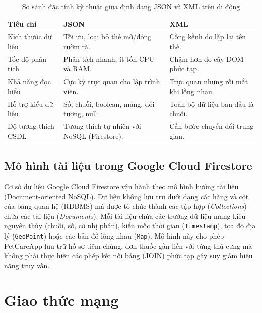 \begin{table}[H]
    \caption{So sánh đặc tính kỹ thuật giữa định dạng JSON và XML trên di động}
    \label{tab:so_sanh_json_xml}
    \centering
    \renewcommand{\arraystretch}{1.2}
    \begin{tabularx}{\textwidth}{|l|X|X|}
        \hline
        \textbf{Tiêu chí} & \textbf{JSON} & \textbf{XML} \\ \hline
        Kích thước dữ liệu & Tối ưu, loại bỏ thẻ mở/đóng rườm rà. & Cồng kềnh do lặp lại tên thẻ. \\ \hline
        Tốc độ phân tích & Phân tích nhanh, ít tốn CPU và RAM. & Chậm hơn do cây DOM phức tạp. \\ \hline
        Khả năng đọc hiểu & Cực kỳ trực quan cho lập trình viên. & Trực quan nhưng rối mắt khi lồng nhau. \\ \hline
        Hỗ trợ kiểu dữ liệu & Số, chuỗi, boolean, mảng, đối tượng, null. & Toàn bộ dữ liệu ban đầu là chuỗi. \\ \hline
        Độ tương thích CSDL & Tương thích tự nhiên với NoSQL (Firestore). & Cần bước chuyển đổi trung gian. \\ \hline
    \end{tabularx}
\end{table}

\subsection{Mô hình tài liệu trong Google Cloud Firestore}
\label{subsec:mo_hinh_firestore}

Cơ sở dữ liệu Google Cloud Firestore vận hành theo mô hình hướng tài liệu (Document-oriented NoSQL). Dữ liệu không lưu trữ dưới dạng các hàng và cột của bảng quan hệ (RDBMS) mà được tổ chức thành các tập hợp (\textit{Collections}) chứa các tài liệu (\textit{Documents}). Mỗi tài liệu chứa các trường dữ liệu mang kiểu nguyên thủy (chuỗi, số, cờ nhị phân), kiểu mốc thời gian (\texttt{Timestamp}), tọa độ địa lý (\texttt{GeoPoint}) hoặc các bản đồ lồng nhau (\texttt{Map}). Mô hình này cho phép PetCareApp lưu trữ hồ sơ tiêm chủng, đơn thuốc gắn liền với từng thú cưng mà không phải thực hiện các phép kết nối bảng (JOIN) phức tạp gây suy giảm hiệu năng truy vấn.

\section{Giao thức mạng}
\label{sec:giao_thuc}

